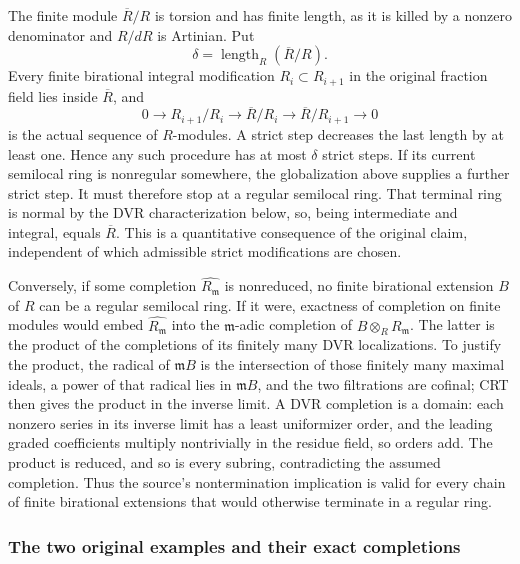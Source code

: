 The finite module \(\overline R/R\) is torsion and has finite length, as it is killed by a nonzero denominator and \(R/dR\) is Artinian. Put \[
 \delta=\operatorname{length}_R(\overline R/R).
\] Every finite birational integral modification \(R_i\subset R_{i+1}\) in the original fraction field lies inside \(\overline R\), and \[
 0\longrightarrow R_{i+1}/R_i
 \longrightarrow \overline R/R_i
 \longrightarrow \overline R/R_{i+1}
 \longrightarrow0
\] is the actual sequence of \(R\)-modules. A strict step decreases the last length by at least one. Hence any such procedure has at most \(\delta\) strict steps. If its current semilocal ring is nonregular somewhere, the globalization above supplies a further strict step. It must therefore stop at a regular semilocal ring. That terminal ring is normal by the DVR characterization below, so, being intermediate and integral, equals \(\overline R\). This is a quantitative consequence of the original claim, independent of which admissible strict modifications are chosen.

Conversely, if some completion \(\widehat{R_{\mathfrak m}}\) is nonreduced, no finite birational extension \(B\) of \(R\) can be a regular semilocal ring. If it were, exactness of completion on finite modules would embed \(\widehat{R_{\mathfrak m}}\) into the \(\mathfrak m\)-adic completion of \(B\otimes_R R_{\mathfrak m}\). The latter is the product of the completions of its finitely many DVR localizations. To justify the product, the radical of \(\mathfrak m B\) is the intersection of those finitely many maximal ideals, a power of that radical lies in \(\mathfrak mB\), and the two filtrations are cofinal; CRT then gives the product in the inverse limit. A DVR completion is a domain: each nonzero series in its inverse limit has a least uniformizer order, and the leading graded coefficients multiply nontrivially in the residue field, so orders add. The product is reduced, and so is every subring, contradicting the assumed completion. Thus the source's nontermination implication is valid for every chain of finite birational extensions that would otherwise terminate in a regular ring.

\subsubsection{The two original examples and their exact completions}\label{algebra-proof-028-the-two-original-examples-and-their-exact-completions}

